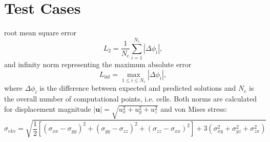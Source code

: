 \documentclass[sn-mathphys,Numbered]{sn-jnl}%
\begin{document}
\section{Test Cases}
\label{sec:test_cases}
%
%
%

root mean square error
\begin{equation}
L_2 = \frac{1}{N_{\text{c}}}\sum_{i=1}^{N_{\text{c}}} |\Delta \phi_i|,
\end{equation}
and infinity norm representing the maximum absolute error
\begin{equation}
L_{\inf} = \max_{1 \leq i \leq N_{\text{c}}} |\Delta \phi_i|,
\end{equation}
where $\Delta \phi_i$ is the difference between expected and predicted solutions and $N_{\text{c}}$ is the overall number of computational points, i.e. cells.
Both norms are calculated for displacement magnitude $|\boldsymbol{u}|=\sqrt{u_x^2+u_y^2+u_z^2}$ and von Mises stress:
\begin{equation}
\sigma_{ekv}=\sqrt{\frac{1}{2}\left[  (\sigma_{xx}-\sigma_{yy})^2+(\sigma_{yy}-\sigma_{zz})^2+(\sigma_{zz}-\sigma_{xx})^2 \right]+3\left(\sigma_{xy}^2+\sigma_{yz}^2+\sigma_{zx}^2\right)}
\end{equation}
%
\end{document}
